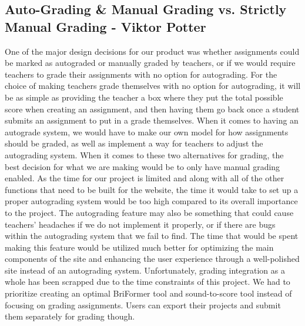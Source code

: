 \documentclass[12pt, letterpaper]{article}
\begin{document}
\subsection*{Auto-Grading \& Manual Grading vs. Strictly Manual Grading - Viktor Potter}
One of the major design decisions for our product was whether assignments could be marked as autograded or manually graded by teachers, or if we would require teachers to grade their assignments with no option for autograding. For the choice of making teachers grade themselves with no option for autograding, it will be as simple as providing the teacher a box where they put the total possible score when creating an assignment, and then having them go back once a student submits an assignment to put in a grade themselves. When it comes to having an autograde system, we would have to make our own model for how assignments should be graded, as well as implement a way for teachers to adjust the autograding system. When it comes to these two alternatives for grading, the best decision for what we are making would be to only have manual grading enabled. As the time for our project is limited and along with all of the other functions that need to be built for the website, the time it would take to set up a proper autograding system would be too high compared to its overall importance to the project. The autograding feature may also be something that could cause teachers' headaches if we do not implement it properly, or if there are bugs within the autograding system that we fail to find. The time that would be spent making this feature would be utilized much better for optimizing the main components of the site and enhancing the user experience through a well-polished site instead of an autograding system. Unfortunately, grading integration as a whole has been scrapped due to the time constraints of this project. We had to prioritize creating an optimal BriFormer tool and sound-to-score tool instead of focusing on grading assignments. Users can export their projects and submit them separately for grading though.
\end{document}
